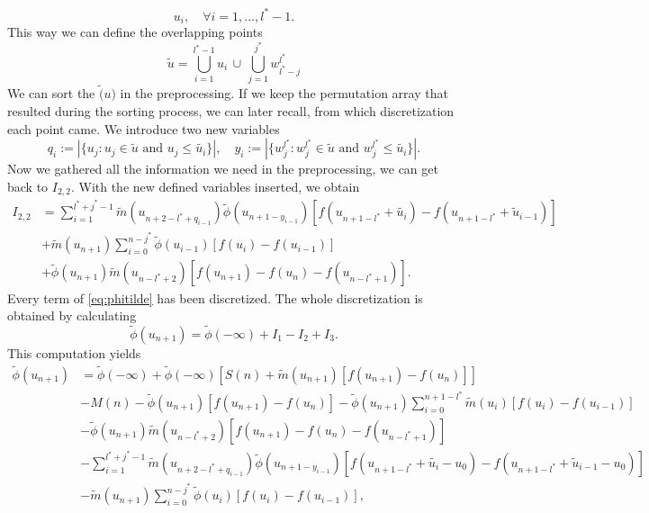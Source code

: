 \documentclass[12pt,a4paper,twoside, open=right]{scrreprt}
\theoremstyle{definition}
\theoremstyle{plain}
\newcommand{\abs}[1]{\left\vert #1\right\vert}
\begin{document}
\begin{equation}
    u_i,\quad\forall i=1,\dotsc,l^*-1.
\end{equation}
This way we can define the overlapping points 
\begin{equation}
    \tilde{u}= \bigcup_{i=1}^{l^*-1}u_i\,\cup\,\bigcup_{j=1}^{j^*}w^{l^*}_{l^*-j}
\end{equation}
We can sort the $\tilde(u)$ in the preprocessing. If we keep the permutation array that resulted during the sorting process, we can later recall, from which discretization each point came. We introduce two new variables
\begin{equation}
    q_i:=\abs{\{u_j\colon u_j\in\tilde{u} \text{ and }u_j\le\tilde{u_i} \}},\quad
    y_i:=\abs{\{w^{l^*}_j\colon w^{l^*}_j\in\tilde{u} \text{ and }w^{l^*}_j\le\tilde{u_i} \}}.
\end{equation}
Now we gathered all the information we need in the preprocessing, we can get back to $I_{2,2}$. With the new defined variables inserted, we obtain
\begin{align}
    I_{2,2}&= \sum_{i=1}^{l^*+j^*-1}\tilde{m}(u_{n+2-l^*+q_{i-1}})\tilde{\phi}(u_{n+1-y_{i-1}})[f(u_{n+1-l^*}+\tilde{u_i})-f(u_{n+1-l^*}+\tilde{u}_{i-1})]\\&+\tilde{m}(u_{n+1})\sum_{i=0}^{n-j^*}\tilde\phi(u_{i-1})[f(u_i)-f(u_{i-1})] \\&+ \tilde\phi(u_{n+1})\tilde{m}(u_{n-l^*+2})[f(u_{n+1})-f(u_n)-f(u_{n-l^*+1})].
\end{align}
Every term of \eqref{eq:phitilde} has been discretized. The whole discretization is obtained by calculating
\begin{equation}
    \tilde\phi(u_{n+1})=\tilde\phi(-\infty) + I_1 -I_2 +I_3.
\end{equation}
This computation yields
\begin{align}
    \tilde\phi(u_{n+1})&=\tilde\phi(-\infty) +\tilde\phi(-\infty)[S(n)+\tilde{m}(u_{n+1})[f(u_{n+1})-f(u_n)]]\label{eq:discphit1}\\&-M(n)\label{eq:discphit2} -\tilde\phi(u_{n+1})[f(u_{n+1})-f(u_{n})]  -\tilde{\phi}(u_{n+1})\sum_{i=0}^{n+1-l^*}\tilde{m}(u_i)[f(u_i)-f(u_{i-1})]\\&- \tilde\phi(u_{n+1})\tilde{m}(u_{n-l^*+2})[f(u_{n+1})-f(u_n)-f(u_{n-l^*+1})] \\&\label{eq:discphit3}-\sum_{i=1}^{l^*+j^*-1}\tilde{m}(u_{n+2-l^*+q_{i-1}})\tilde{\phi}(u_{n+1-y_{i-1}})[f(u_{n+1-l^*}+\tilde{u_i}-u_0)-f(u_{n+1-l^*}+\tilde{u}_{i-1}-u_0)]\\&\label{eq:discphit4}-\tilde{m}(u_{n+1})\sum_{i=0}^{n-j^*}\tilde\phi(u_{i})[f(u_i)-f(u_{i-1})],
\end{align}
\end{document}
